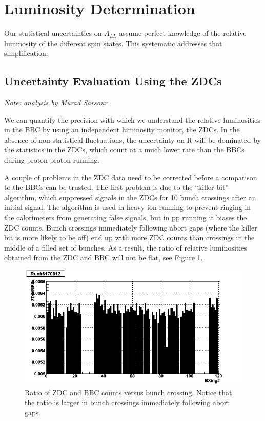 \section{Luminosity Determination}

Our statistical uncertainties on $A_{LL}$ assume perfect knowledge of the
relative luminosity of the different spin states. This systematic addresses
that simplification.

\subsection{Uncertainty Evaluation Using the ZDCs}

\textit{Note: \href{http://mare.tamu.edu/star/2005n06Jets/2005relLumSys_mar29_2008/}{analysis by Murad Sarsour}}

We can quantify the precision with which we understand the relative
luminosities in the BBC by using an independent luminosity monitor, the ZDCs.
In the absence of non-statistical fluctuations, the uncertainty on R will be
dominated by the statistics in the ZDCs, which count at a much lower rate than
the BBCs during proton-proton running.

A couple of problems in the ZDC data need to be corrected before a comparison
to the BBCs can be trusted. The first problem is due to the ``killer bit''
algorithm, which suppressed signals in the ZDCs for 10 bunch crossings after
an initial signal. The algorithm is used in heavy ion running to prevent
ringing in the calorimeters from generating false signals, but in pp running
it biases the ZDC counts. Bunch crossings immediately following abort gaps
(where the killer bit is more likely to be off) end up with more ZDC counts
than crossings in the middle of a filled set of bunches. As a result, the
ratio of relative luminosities obtained from the ZDC and BBC will not be flat,
see Figure \ref{fig:zdctobbc6170012zoom}.

\begin{figure}
  \includegraphics[width=1.0\textwidth]{figures/zdctobbc6170012zoom}
  \caption{Ratio of ZDC and BBC counts versus bunch crossing.  Notice that the ratio is larger in bunch crossings immediately following abort gaps.}
  \label{fig:zdctobbc6170012zoom}
\end{figure}

